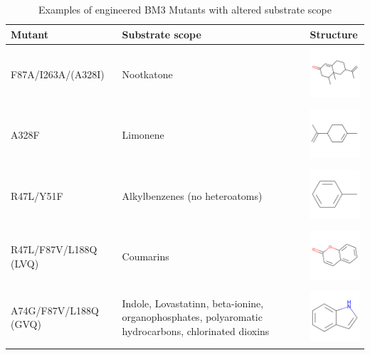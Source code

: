 \documentclass[16pt]{book}
\begin{document}
\begin{table}
	\begin{center}
		\caption{\label{bm3_table}Examples of engineered BM3 Mutants with altered substrate scope \cite{wong}}
		\begin{tabular}{l|p{3cm}|l}
		\textbf{Mutant} & \textbf{Substrate scope} & \textbf{Structure} \\
		\hline 
		F87A/I263A/(A328I) & Nootkatone & \includegraphics[width = 2cm, height= 2cm, keepaspectratio=true]{img/nookatone.png} \\
		A328F & Limonene & \includegraphics[width=2cm, height= 2cm, keepaspectratio=true]{img/limonene.png} \\
		R47L/Y51F & Alkylbenzenes (no heteroatoms) & \includegraphics[width=2cm, height= 2cm, keepaspectratio=true]{img/alkyl-benzene.png} \\
			R47L/F87V/L188Q (LVQ) & Coumarins & \includegraphics[width=2cm, height= 2cm, keepaspectratio=true]{img/coumarin.png} \\ %
			A74G/F87V/L188Q (GVQ) & Indole, Lovastatinn, beta-ionine, organophosphates, polyaromatic hydrocarbons, chlorinated dioxins & \includegraphics[width=2cm, height= 2cm, keepaspectratio=true]{img/indole.png} \\
	\end{tabular}
	\end{center}
\end{table}
\end{document}
